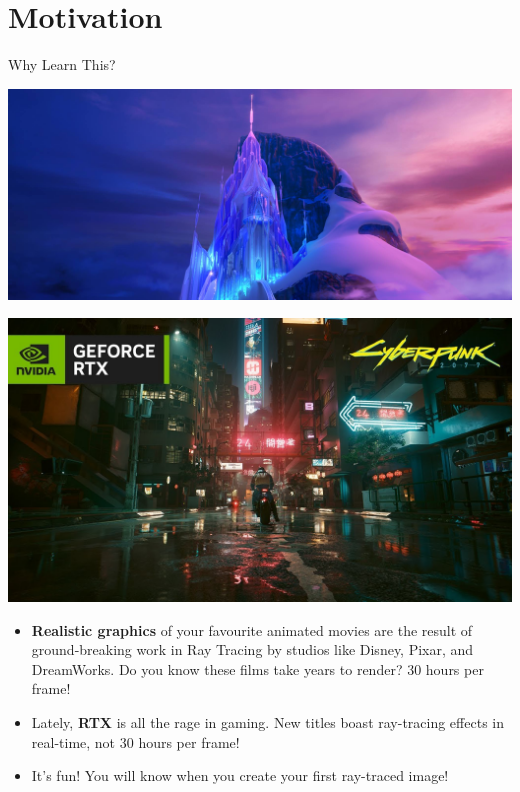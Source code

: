 
\section{Motivation}
\begin{frame}{Why Learn This?}
    \pause
    \begin{minipage}{0.45\textwidth}
        \centering
        \includegraphics[width=\linewidth]{images/frozen_castle.jpg}
    \end{minipage}%
    \hfill
    \pause
    \begin{minipage}{0.45\textwidth}
        \centering
        \includegraphics[width=\linewidth]{images/cyberpunk_rtx.jpg}
    \end{minipage}

    \begin{itemize}
        \item<3-> \textbf{Realistic graphics} of your favourite animated movies are the result of ground-breaking work in Ray Tracing by
              studios like Disney, Pixar, and DreamWorks. Do you know these films take years to render? 30 hours per frame!
        \item<4-> Lately, \textbf{RTX} is all the rage in gaming. New titles boast ray-tracing effects in real-time, not 30 hours per frame!
        \item<5-> It's fun! You will know when you create your first ray-traced image!
    \end{itemize}
\end{frame}

